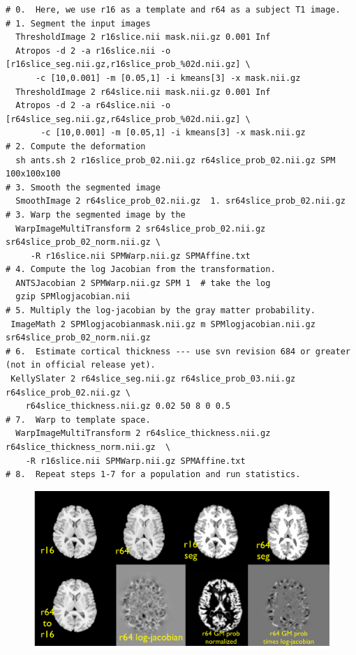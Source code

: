 \documentclass{InsightArticle}
\begin{document}
\begin{verbatim}
# 0.  Here, we use r16 as a template and r64 as a subject T1 image. 
# 1. Segment the input images 
  ThresholdImage 2 r16slice.nii mask.nii.gz 0.001 Inf
  Atropos -d 2 -a r16slice.nii -o [r16slice_seg.nii.gz,r16slice_prob_%02d.nii.gz] \
      -c [10,0.001] -m [0.05,1] -i kmeans[3] -x mask.nii.gz
  ThresholdImage 2 r64slice.nii mask.nii.gz 0.001 Inf
  Atropos -d 2 -a r64slice.nii -o [r64slice_seg.nii.gz,r64slice_prob_%02d.nii.gz] \
       -c [10,0.001] -m [0.05,1] -i kmeans[3] -x mask.nii.gz
# 2. Compute the deformation
  sh ants.sh 2 r16slice_prob_02.nii.gz r64slice_prob_02.nii.gz SPM 100x100x100
# 3. Smooth the segmented image 
  SmoothImage 2 r64slice_prob_02.nii.gz  1. sr64slice_prob_02.nii.gz  
# 3. Warp the segmented image by the 
  WarpImageMultiTransform 2 sr64slice_prob_02.nii.gz  sr64slice_prob_02_norm.nii.gz \ 
     -R r16slice.nii SPMWarp.nii.gz SPMAffine.txt 
# 4. Compute the log Jacobian from the transformation.
  ANTSJacobian 2 SPMWarp.nii.gz SPM 1  # take the log
  gzip SPMlogjacobian.nii 
# 5. Multiply the log-jacobian by the gray matter probability. 
 ImageMath 2 SPMlogjacobianmask.nii.gz m SPMlogjacobian.nii.gz sr64slice_prob_02_norm.nii.gz
# 6.  Estimate cortical thickness --- use svn revision 684 or greater (not in official release yet). 
 KellySlater 2 r64slice_seg.nii.gz r64slice_prob_03.nii.gz  r64slice_prob_02.nii.gz \
    r64slice_thickness.nii.gz 0.02 50 8 0 0.5
# 7.  Warp to template space. 
  WarpImageMultiTransform 2 r64slice_thickness.nii.gz  r64slice_thickness_norm.nii.gz  \
    -R r16slice.nii SPMWarp.nii.gz SPMAffine.txt 
# 8.  Repeat steps 1-7 for a population and run statistics.
\end{verbatim}
\begin{figure}
\includegraphics[width=1\textwidth]{Figures/morphometry.pdf}
\label{fig:morph}
\end{figure}
\end{document}
